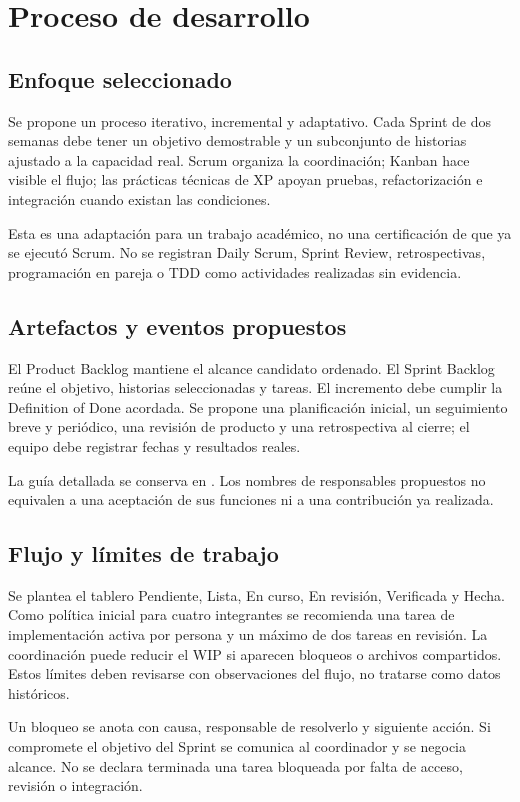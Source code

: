 \chapter{Proceso de desarrollo}
\section{Enfoque seleccionado}
Se propone un proceso iterativo, incremental y adaptativo. Cada Sprint de dos semanas debe tener un objetivo demostrable y un subconjunto de historias ajustado a la capacidad real. Scrum organiza la coordinación; Kanban hace visible el flujo; las prácticas técnicas de XP apoyan pruebas, refactorización e integración cuando existan las condiciones.

Esta es una adaptación para un trabajo académico, no una certificación de que ya se ejecutó Scrum. No se registran Daily Scrum, Sprint Review, retrospectivas, programación en pareja o TDD como actividades realizadas sin evidencia.

\section{Artefactos y eventos propuestos}
El Product Backlog mantiene el alcance candidato ordenado. El Sprint Backlog reúne el objetivo, historias seleccionadas y tareas. El incremento debe cumplir la Definition of Done acordada. Se propone una planificación inicial, un seguimiento breve y periódico, una revisión de producto y una retrospectiva al cierre; el equipo debe registrar fechas y resultados reales.

La guía detallada se conserva en . Los nombres de responsables propuestos no equivalen a una aceptación de sus funciones ni a una contribución ya realizada.

\section{Flujo y límites de trabajo}
Se plantea el tablero Pendiente, Lista, En curso, En revisión, Verificada y Hecha. Como política inicial para cuatro integrantes se recomienda una tarea de implementación activa por persona y un máximo de dos tareas en revisión. La coordinación puede reducir el WIP si aparecen bloqueos o archivos compartidos. Estos límites deben revisarse con observaciones del flujo, no tratarse como datos históricos.

Un bloqueo se anota con causa, responsable de resolverlo y siguiente acción. Si compromete el objetivo del Sprint se comunica al coordinador y se negocia alcance. No se declara terminada una tarea bloqueada por falta de acceso, revisión o integración.

